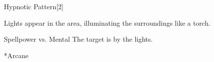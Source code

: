 \begin{spellsection}{Hypnotic Pattern}[2]
    \begin{spellheader}
    \end{spellheader}
    \begin{spellcontent}
        \begin{spelltargetinginfo}
        \end{spelltargetinginfo}
        \begin{spelleffects}
            \spelleffect Lights appear in the area, illuminating the surroundings like a torch.
            \spelldur \durshort
        \end{spelleffects}
    \end{spellcontent}
    \begin{spellsubcontent}
        \begin{spelltargetinginfo}
        \end{spelltargetinginfo}
        \begin{spelleffects}
            \begin{spellattack}{Spellpower vs. Mental}
                \spellsuccess The target is \fascinated by the lights.
            \end{spellattack}
        \end{spelleffects}
    \end{spellsubcontent}
    \begin{spellfooter}
        *{Arcane}
        \miscastyou
    \end{spellfooter}
\end{spellsection}

